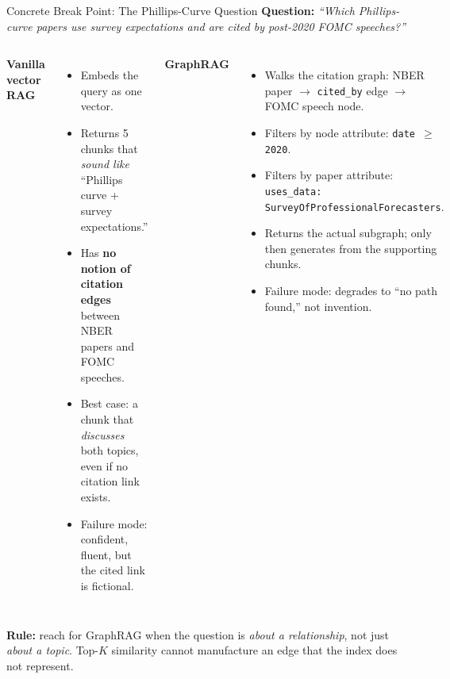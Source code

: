\begin{frame}{Concrete Break Point: The Phillips-Curve Question}
\textbf{Question:} \emph{``Which Phillips-curve papers use survey expectations and are cited by post-2020 FOMC speeches?''}

\smallskip
\begin{columns}[T,totalwidth=\textwidth]
\textbf{Vanilla vector RAG}
\begin{itemize}\small
\item Embeds the query as one vector.
\item Returns 5 chunks that \emph{sound like} ``Phillips curve + survey expectations.''
\item Has \textbf{no notion of citation edges} between NBER papers and FOMC speeches.
\item Best case: a chunk that \emph{discusses} both topics, even if no citation link exists.
\item Failure mode: confident, fluent, but the cited link is fictional.
\end{itemize}

\textbf{GraphRAG}
\begin{itemize}\small
\item Walks the citation graph: NBER paper $\to$ \texttt{cited\_by} edge $\to$ FOMC speech node.
\item Filters by node attribute: \texttt{date $\geq$ 2020}.
\item Filters by paper attribute: \texttt{uses\_data: SurveyOfProfessionalForecasters}.
\item Returns the actual subgraph; only then generates from the supporting chunks.
\item Failure mode: degrades to ``no path found,'' not invention.
\end{itemize}
\end{columns}

\vspace{0.12cm}
\begin{takeawaybox}
\textbf{Rule:} reach for GraphRAG when the question is \emph{about a relationship}, not just \emph{about a topic}. Top-$K$ similarity cannot manufacture an edge that the index does not represent.
\end{takeawaybox}
\end{frame}

